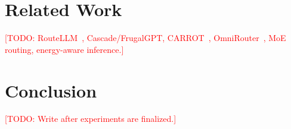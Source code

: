\documentclass[11pt]{article}
\newcommand{\todo}[1]{\textcolor{red}{[TODO: #1]}}
\begin{document}
\section{Related Work}
\label{sec:related}
\todo{RouteLLM~\cite{ong2024routellm}, Cascade/FrugalGPT, CARROT~\cite{somerstep2025carrot}, OmniRouter~\cite{mei2025omnirouter}, MoE routing, energy-aware inference.}

\section{Conclusion}
\label{sec:conclusion}
\todo{Write after experiments are finalized.}



\end{document}
